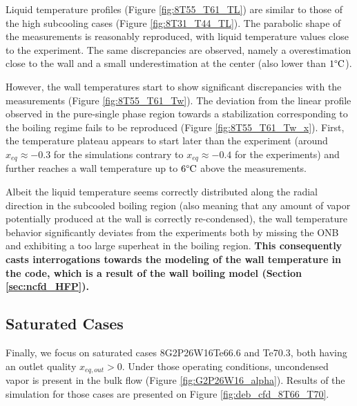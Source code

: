 \npar

Liquid temperature profiles (Figure \ref{fig:8T55_T61_TL}) are similar to those of the high subcooling cases (Figure \ref{fig:8T31_T44_TL}). The parabolic shape of the measurements is reasonably reproduced, with liquid temperature values close to the experiment. The same discrepancies are observed, namely a overestimation close to the wall and a small underestimation at the center (also lower than $1\degree\mathrm{C}$).

\npar

However, the wall temperatures start to show significant discrepancies with the measurements (Figure \ref{fig:8T55_T61_Tw}). The deviation from the linear profile observed in the pure-single phase region towards a stabilization corresponding to the boiling regime fails to be reproduced (Figure \ref{fig:8T55_T61_Tw_x}). First, the temperature plateau appears to start later than the experiment (around $x_{eq}\approx -0.3$ for the simulations contrary to $x_{eq} \approx -0.4$ for the experiments) and further reaches a wall temperature up to $6 \degree\mathrm{C}$ above the measurements.

\npar
Albeit the liquid temperature seems correctly distributed along the radial direction in the subcooled boiling region (also meaning that any amount of vapor potentially produced at the wall is correctly re-condensed), the wall temperature behavior significantly deviates from the experiments both by missing the ONB and exhibiting a too large superheat in the boiling region. \textbf{This consequently casts interrogations towards the modeling of the wall temperature in the code, which is a result of the wall boiling model (Section \ref{sec:ncfd_HFP}).}



\subsection{Saturated Cases}

Finally, we focus on saturated cases 8G2P26W16Te66.6 and Te70.3, both having an outlet quality $x_{eq,out} > 0$. Under those operating conditions, uncondensed vapor is present in the bulk flow (Figure \ref{fig:G2P26W16_alpha}). Results of the simulation for those cases are presented on Figure \ref{fig:deb_cfd_8T66_T70}.



